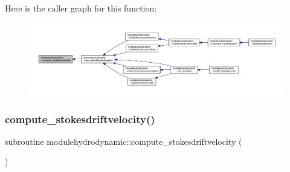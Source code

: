 Here is the caller graph for this function\+:\nopagebreak
\begin{figure}[H]
\begin{center}
\leavevmode
\includegraphics[width=350pt]{namespacemodulehydrodynamic_abb245df1c1a4f6ca752bd7181e8c61e1_icgraph}
\end{center}
\end{figure}
\mbox{\label{namespacemodulehydrodynamic_aa9d607cb819115ecbd2eaade1767926c}} 
\subsubsection{\texorpdfstring{compute\+\_\+stokesdriftvelocity()}{compute\_stokesdriftvelocity()}}
{\footnotesize\ttfamily subroutine modulehydrodynamic\+::compute\+\_\+stokesdriftvelocity (\begin{DoxyParamCaption}{ }\end{DoxyParamCaption})\hspace{0.3cm}{\ttfamily [private]}}


